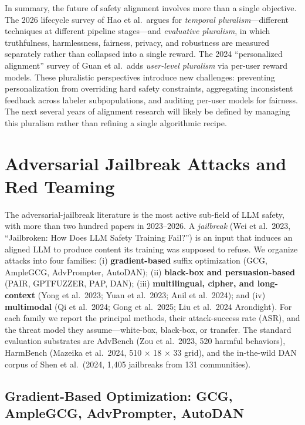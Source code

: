 In summary, the future of safety alignment involves more than a single objective. The 2026 lifecycle survey of Hao et al.~argues for \emph{temporal pluralism}---different techniques at different pipeline stages---and \emph{evaluative pluralism}, in which truthfulness, harmlessness, fairness, privacy, and robustness are measured separately rather than collapsed into a single reward. The 2024 ``personalized alignment'' survey of Guan et al.~adds \emph{user-level pluralism} via per-user reward models. These pluralistic perspectives introduce new challenges: preventing personalization from overriding hard safety constraints, aggregating inconsistent feedback across labeler subpopulations, and auditing per-user models for fairness. The next several years of alignment research will likely be defined by managing this pluralism rather than refining a single algorithmic recipe.

\section{Adversarial Jailbreak Attacks and Red Teaming}\label{adversarial-jailbreak-attacks-and-red-teaming}

The adversarial-jailbreak literature is the most active sub-field of LLM safety, with more than two hundred papers in 2023--2026. A \emph{jailbreak} (Wei et al.~2023, ``Jailbroken: How Does LLM Safety Training Fail?'') is an input that induces an aligned LLM to produce content its training was supposed to refuse. We organize attacks into four families: (i) \textbf{gradient-based} suffix optimization (GCG, AmpleGCG, AdvPrompter, AutoDAN); (ii) \textbf{black-box and persuasion-based} (PAIR, GPTFUZZER, PAP, DAN); (iii) \textbf{multilingual, cipher, and long-context} (Yong et al.~2023; Yuan et al.~2023; Anil et al.~2024); and (iv) \textbf{multimodal} (Qi et al.~2024; Gong et al.~2025; Liu et al.~2024 Arondight). For each family we report the principal methods, their attack-success rate (ASR), and the threat model they assume---white-box, black-box, or transfer. The standard evaluation substrates are AdvBench (Zou et al.~2023, 520 harmful behaviors), HarmBench (Mazeika et al.~2024, 510 × 18 × 33 grid), and the in-the-wild DAN corpus of Shen et al.~(2024, 1,405 jailbreaks from 131 communities).

\subsection{Gradient-Based Optimization: GCG, AmpleGCG, AdvPrompter, AutoDAN}\label{gradient-based-optimization-gcg-amplegcg-advprompter-autodan}

